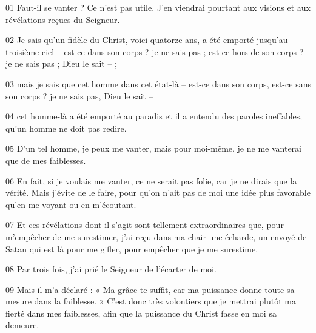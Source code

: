 01 Faut-il se vanter ? Ce n’est pas utile. J’en viendrai pourtant aux visions et aux révélations reçues du Seigneur.

02 Je sais qu’un fidèle du Christ, voici quatorze ans, a été emporté jusqu’au troisième ciel – est-ce dans son corps ? je ne sais pas ; est-ce hors de son corps ? je ne sais pas ; Dieu le sait – ;

03 mais je sais que cet homme dans cet état-là – est-ce dans son corps, est-ce sans son corps ? je ne sais pas, Dieu le sait –

04 cet homme-là a été emporté au paradis et il a entendu des paroles ineffables, qu’un homme ne doit pas redire.

05 D’un tel homme, je peux me vanter, mais pour moi-même, je ne me vanterai que de mes faiblesses.

06 En fait, si je voulais me vanter, ce ne serait pas folie, car je ne dirais que la vérité. Mais j’évite de le faire, pour qu’on n’ait pas de moi une idée plus favorable qu’en me voyant ou en m’écoutant.

07 Et ces révélations dont il s’agit sont tellement extraordinaires que, pour m’empêcher de me surestimer, j’ai reçu dans ma chair une écharde, un envoyé de Satan qui est là pour me gifler, pour empêcher que je me surestime.

08 Par trois fois, j’ai prié le Seigneur de l’écarter de moi.

09 Mais il m’a déclaré : « Ma grâce te suffit, car ma puissance donne toute sa mesure dans la faiblesse. » C’est donc très volontiers que je mettrai plutôt ma fierté dans mes faiblesses, afin que la puissance du Christ fasse en moi sa demeure.